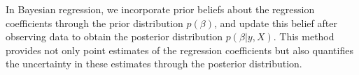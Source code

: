 In Bayesian regression, we incorporate prior beliefs about the regression coefficients through the prior distribution $ p(\beta) $, and update this belief after observing data to obtain the posterior distribution $ p(\beta | y, X) $. This method provides not only point estimates of the regression coefficients but also quantifies the uncertainty in these estimates through the posterior distribution.














